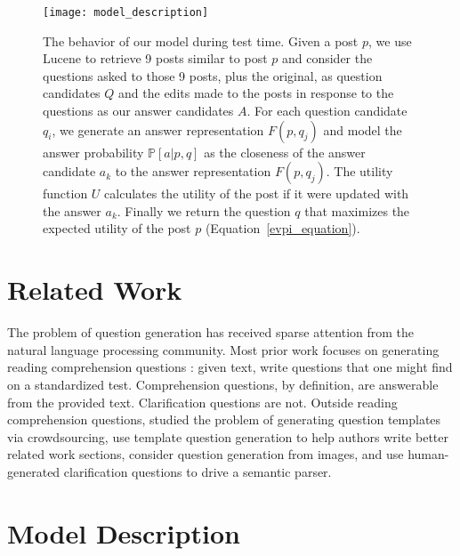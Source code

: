 \documentclass[11pt,a4paper]{article}
\begin{document}
\begin{figure}[t]
	\centering
	\texttt{[image: model\_description]}
	\caption{\small The behavior of our model during test time. Given a post $p$, we use Lucene to retrieve 9 posts similar to post $p$ and consider the questions asked to those 9 posts, plus the original, as question candidates $Q$ and the edits made to the posts in response to the questions as our answer candidates $A$. For each question candidate $q_i$, we generate an answer representation $F(p,q_j)$ and model the answer probability $\mathbb{P}[a | p,q]$ as the closeness of the answer candidate $a_k$ to the answer representation $F(p,q_j)$. The utility function $U$ calculates the utility of the post if it were updated with the answer $a_k$. Finally we return the question $q$ that maximizes the expected utility of the post $p$ (Equation~\ref{evpi_equation}).}
	\label{model}
\end{figure}

\section{Related Work}
The problem of question generation has received sparse attention from the natural language processing community. Most prior work focuses on generating reading comprehension questions \cite{vanderwende2008importance,penas2010filling,heilman2011automatic}: given text, write questions that one might find on a standardized test. Comprehension questions, by definition, are answerable from the provided text. Clarification questions are not. Outside reading comprehension questions,  studied the problem of generating question templates via crowdsourcing,  use template question generation to help authors write better related work sections,  consider question generation from images, and   use human-generated clarification questions to drive a semantic parser.

\section{Model Description}\label{model_description}
\end{document}
